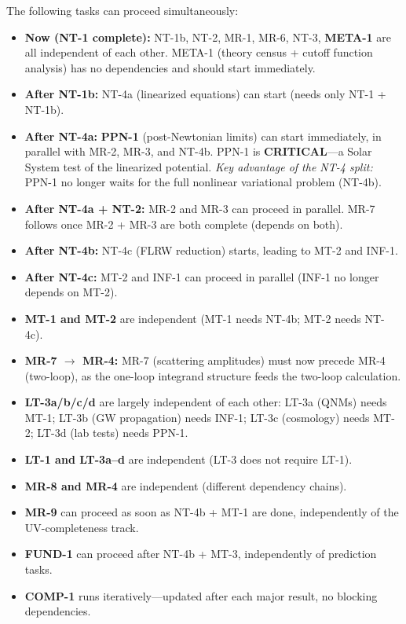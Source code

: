 \documentclass[12pt,a4paper]{article}
\begin{document}
The following tasks can proceed simultaneously:
\begin{itemize}
  \item \textbf{Now (NT-1 complete):} NT-1b, NT-2, MR-1, MR-6, NT-3,
    \textbf{META-1} are all independent of each other.
    META-1 (theory census + cutoff function analysis) has no dependencies
    and should start immediately.
  \item \textbf{After NT-1b:} NT-4a (linearized equations) can start
    (needs only NT-1 + NT-1b).
  \item \textbf{After NT-4a:} \textbf{PPN-1} (post-Newtonian limits) can start
    immediately, in parallel with MR-2, MR-3, and NT-4b.
    PPN-1 is \textbf{CRITICAL}---a Solar System test of the linearized potential.
    \emph{Key advantage of the NT-4 split:} PPN-1 no longer waits for the full
    nonlinear variational problem (NT-4b).
  \item \textbf{After NT-4a + NT-2:} MR-2 and MR-3 can proceed in parallel.
    MR-7 follows once MR-2 + MR-3 are both complete (depends on both).
  \item \textbf{After NT-4b:} NT-4c (FLRW reduction) starts, leading to MT-2 and INF-1.
  \item \textbf{After NT-4c:} MT-2 and INF-1 can proceed in parallel
    (INF-1 no longer depends on MT-2).
  \item \textbf{MT-1 and MT-2} are independent (MT-1 needs NT-4b; MT-2 needs NT-4c).
  \item \textbf{MR-7 $\to$ MR-4:} MR-7 (scattering amplitudes) must now precede
    MR-4 (two-loop), as the one-loop integrand structure feeds the two-loop calculation.
  \item \textbf{LT-3a/b/c/d} are largely independent of each other:
    LT-3a (QNMs) needs MT-1; LT-3b (GW propagation) needs INF-1;
    LT-3c (cosmology) needs MT-2; LT-3d (lab tests) needs PPN-1.
  \item \textbf{LT-1 and LT-3a--d} are independent (LT-3 does not require LT-1).
  \item \textbf{MR-8 and MR-4} are independent (different dependency chains).
  \item \textbf{MR-9} can proceed as soon as NT-4b + MT-1 are done,
    independently of the UV-completeness track.
  \item \textbf{FUND-1} can proceed after NT-4b + MT-3, independently of prediction tasks.
  \item \textbf{COMP-1} runs iteratively---updated after each major result,
    no blocking dependencies.
\end{itemize}
\end{document}
